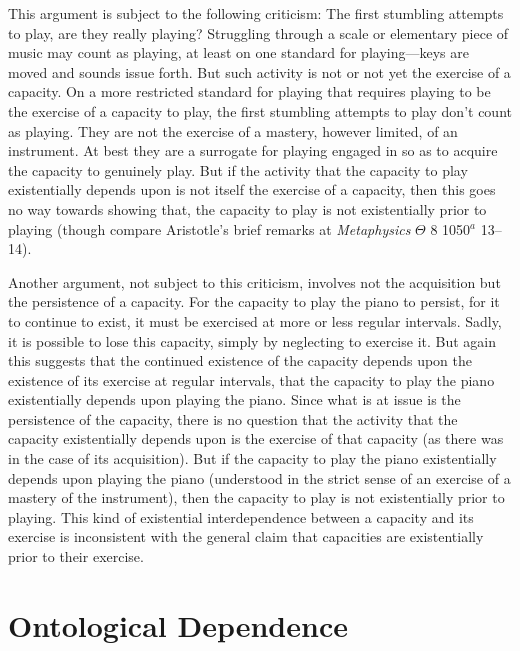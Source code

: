 \documentclass[12pt]{article}
\begin{document}
This argument is subject to the following criticism: The first stumbling attempts to play, are they really playing? Struggling through a scale or elementary piece of music may count as playing, at least on one standard for playing---keys are moved and sounds issue forth. But such activity is not or not yet the exercise of a capacity. On a more restricted standard for playing that requires playing to be the exercise of a capacity to play, the first stumbling attempts to play don't count as playing. They are not the exercise of a mastery, however limited, of an instrument. At best they are a surrogate for playing engaged in so as to acquire the capacity to genuinely play. But if the activity that the capacity to play existentially depends upon is not itself the exercise of a capacity, then this goes no way towards showing that, the capacity to play is not existentially prior to playing (though compare Aristotle's brief remarks at \emph{Metaphysics} \( \Theta \) 8 1050\( ^{a} \) 13--14).

Another argument, not subject to this criticism, involves not the acquisition but the persistence of a capacity. For the capacity to play the piano to persist, for it to continue to exist, it must be exercised at more or less regular intervals. Sadly, it is possible to lose this capacity, simply by neglecting to exercise it. But again this suggests that the continued existence of the capacity depends upon the existence of its exercise at regular intervals, that the capacity to play the piano existentially depends upon playing the piano. Since what is at issue is the persistence of the capacity, there is no question that the activity that the capacity existentially depends upon is the exercise of that capacity (as there was in the case of its acquisition). But if the capacity to play the piano existentially depends upon playing the piano (understood in the strict sense of an exercise of a mastery of the instrument), then the capacity to play is not existentially prior to playing. This kind of existential interdependence between a capacity and its exercise is inconsistent with the general claim that capacities are existentially prior to their exercise.


\section{Ontological Dependence} %
\label{sec:capacities_and_their_exercise_ontological_dependence}
\end{document}
